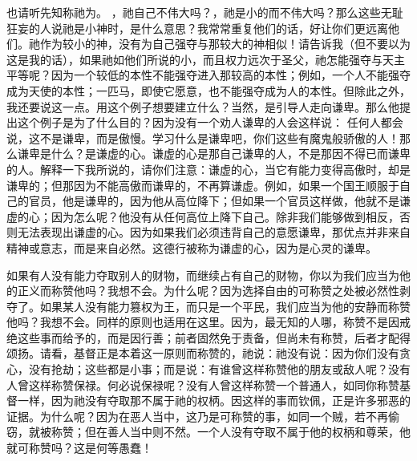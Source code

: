 也请听先知称祂为。 ，祂自己不伟大吗？，祂是小的而不伟大吗？那么这些无耻狂妄的人说祂是小神时，是什么意思？我常常重复他们的话，好让你们更远离他们。祂作为较小的神，没有为自己强夺与那较大的神相似！请告诉我（但不要以为这是我的话），如果祂如他们所说的小，而且权力远次于圣父，祂怎能强夺与天主平等呢？因为一个较低的本性不能强夺进入那较高的本性；例如，一个人不能强夺成为天使的本性；一匹马，即使它愿意，也不能强夺成为人的本性。但除此之外，我还要说这一点。用这个例子想要建立什么？当然，是引导人走向谦卑。那么他提出这个例子是为了什么目的？因为没有一个劝人谦卑的人会这样说： 任何人都会说，这不是谦卑，而是傲慢。学习什么是谦卑吧，你们这些有魔鬼般骄傲的人！那么谦卑是什么？是谦虚的心。谦虚的心是那自己谦卑的人，不是那因不得已而谦卑的人。解释一下我所说的，请你们注意：谦虚的心，当它有能力变得高傲时，却是谦卑的；但那因为不能高傲而谦卑的，不再算谦虚。例如，如果一个国王顺服于自己的官员，他是谦卑的，因为他从高位降下；但如果一个官员这样做，他就不是谦虚的心；因为怎么呢？他没有从任何高位上降下自己。除非我们能够做到相反，否则无法表现出谦虚的心。因为如果我们必须违背自己的意愿谦卑，那优点并非来自精神或意志，而是来自必然。这德行被称为谦虚的心，因为是心灵的谦卑。\par

如果有人没有能力夺取别人的财物，而继续占有自己的财物，你以为我们应当为他的正义而称赞他吗？我想不会。为什么呢？因为选择自由的可称赞之处被必然性剥夺了。如果某人没有能力篡权为王，而只是一个平民，我们应当为他的安静而称赞他吗？我想不会。同样的原则也适用在这里。因为，最无知的人哪，称赞不是因戒绝这些事而给予的，而是因行善；前者固然免于责备，但尚未有称赞，后者才配得颂扬。请看，基督正是本着这一原则而称赞的，祂说：祂没有说：因为你们没有贪心，没有抢劫；这些都是小事；而是说：有谁曾这样称赞他的朋友或敌人呢？没有人曾这样称赞保禄。何必说保禄呢？没有人曾这样称赞一个普通人，如同你称赞基督一样，因为祂没有夺取那不属于祂的权柄。因这样的事而钦佩，正是许多邪恶的证据。为什么呢？因为在恶人当中，这乃是可称赞的事，如同一个贼，若不再偷窃，就被称赞；但在善人当中则不然。一个人没有夺取不属于他的权柄和尊荣，他就可称赞吗？这是何等愚蠢！\par

